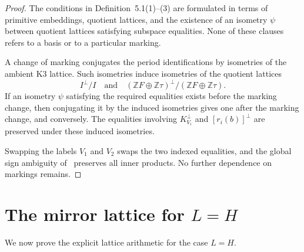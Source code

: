 \documentclass[12pt]{article}
\theoremstyle{plain}
\theoremstyle{definition}
\newcommand{\bZ}{\mathbb{Z}}
\begin{document}
\begin{proof}
The conditions in Definition~5.1(1)--(3) are formulated in terms of primitive embeddings, quotient lattices, and the existence of an isometry $\psi$ between quotient lattices satisfying subspace equalities.  None of these clauses refers to a basis or to a particular marking.

A change of marking conjugates the period identifications by isometries of the ambient K3 lattice.  Such isometries induce isometries of the quotient lattices
\[
I^\perp/I
\quad\text{and}\quad
(\bZ F\oplus \bZ \tau)^\perp/(\bZ F\oplus \bZ\tau).
\]
If an isometry $\psi$ satisfying the required equalities exists before the marking change, then conjugating it by the induced isometries gives one after the marking change, and conversely.  The equalities involving $K_{V_i}^\perp$ and $[r_i(b)]^\perp$ are preserved under these induced isometries.

Swapping the labels $V_1$ and $V_2$ swaps the two indexed equalities, and the global sign ambiguity of~\cite[Proposition~2.37]{GT24} preserves all inner products.  No further dependence on markings remains.
\end{proof}

\section{The mirror lattice for $L=H$}

We now prove the explicit lattice arithmetic for the case $L=H$.
\end{document}
